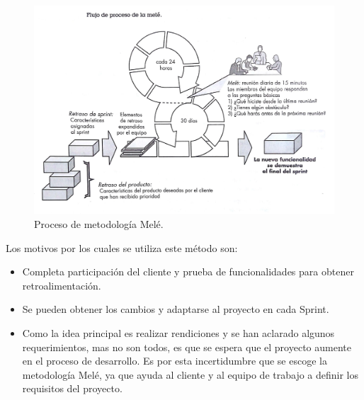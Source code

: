 \begin{figure}[h!]
	\includegraphics[width=\textwidth]{Imagenes/mele.jpg}
	\caption{\label{fig: procesoMele} Proceso de metodología Melé.}
\end{figure}

Los motivos por los cuales se utiliza este método son:

\begin{itemize}
	\item Completa participación del cliente y prueba de funcionalidades para obtener retroalimentación.

	\item Se pueden obtener los cambios y adaptarse al proyecto en cada Sprint.

	\item Como la idea principal es realizar rendiciones y se han aclarado algunos requerimientos, mas no son todos, es que se espera que el proyecto aumente en el proceso de desarrollo. Es por esta incertidumbre que se escoge la metodología Melé, ya que ayuda al cliente y al equipo de trabajo a definir los requisitos del proyecto.
\end{itemize}

